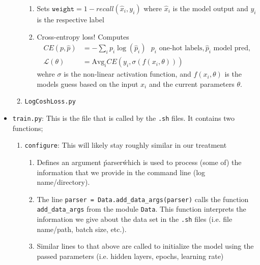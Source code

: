 \begin{itemize}
\begin{enumerate}
\begin{enumerate}
                \item Sets $\texttt{weight} = 1 - recall(\hat{x}_i, y_i)$ where $\hat{x}_i$ is the model output and $y_i$ is the respective label
                
                \item Cross-entropy loss! Computes
                \begin{equation}
                    \begin{aligned}
                        CE(p,  \hat{p}) &= -\sum_ip_i\log(\hat{p}_i) \ \ \ p_i \text{ one-hot labels}, \hat{p}_i \text{ model pred,}\\
                        \mathcal{L}(\theta) &= \text{Avg}_i CE(y_i, \sigma(f(x_i, \theta)))
                    \end{aligned}
                \end{equation}
                wehre $\sigma$ is the non-linear activation function, and $f(x_i, \theta)$ is the models guess based on the input $x_i$ and the current parameters $\theta$. 
            \end{enumerate}

        \item \texttt{LogCoshLoss.py}
    \end{enumerate}

    \item \texttt{train.py}: This is the file that is called by the \texttt{.sh} files. It contains two functions;
        \begin{enumerate}
            \item \texttt{configure}: This will likely stay roughly similar in our treatment
                \begin{enumerate}
                    \item Defines an argument \'parser\' which is used to process (some of) the information that we provide in the command line (log name/directory).

                    \item The line \texttt{parser = Data.add\_data\_args(parser)} calls the function \texttt{add\_data\_args} from the module \texttt{Data}. This function interprets the information we give about the data set in the \texttt{.sh} files (i.e. file name/path, batch size, etc.).

                    \item Similar lines to that above are called to initialize the model using the passed parameters (i.e. hidden layers, epochs, learning rate)
                \end{enumerate}


\end{enumerate}
\end{itemize}
